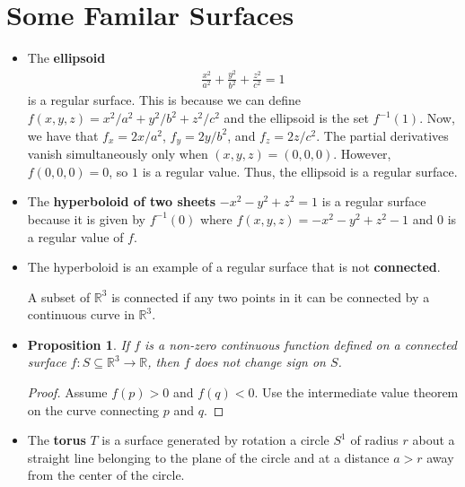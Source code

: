\documentclass[10pt]{article}
\newtheorem{proposition}[lemma]{Proposition}
\newcommand{\ra}{\rightarrow}
\newcommand{\Real}{\mathbb{R}}
\newcommand{\sseq}{\subseteq}
\begin{document}
  \section{Some Familar Surfaces}
  \begin{itemize}
    \item The {\bf ellipsoid}
    \begin{align*}
      \frac{x^2}{a^2}  + \frac{y^2}{b^2} + \frac{z^2}{c^2}  = 1
    \end{align*}
    is a regular surface. This is because we can define $f(x,y,z) = x^2/a^2 + y^2/b^2 + z^2/c^2$ and the ellipsoid is the set $f^{-1}(1)$.
    Now, we have that $f_x = 2x/a^2$, $f_y = 2y/b^2$, and $f_z = 2z/c^2$. The partial derivatives vanish simultaneously only when $(x,y,z) = (0,0,0)$. However, $f(0,0,0) = 0$, so $1$ is a regular value. Thus, the ellipsoid is a regular surface.

    \item The {\bf hyperboloid of two sheets} $-x^2 -y^2 + z^2 = 1$ is a regular surface because it is given by $f^{-1}(0)$ where $f(x,y,z) = -x^2 - y^2 + z^2 -1$ and $0$ is a regular value of $f$.

    \item The hyperboloid is an example of a regular surface that is not {\bf connected}. 

    A subset of $\Real^3$ is connected if any two points in it can be connected by a continuous curve in $\Real^3$.

    \item \begin{proposition}
      If $f$ is a non-zero continuous function defined on a connected surface $f:S \sseq \Real^3 \ra \Real$, then $f$ does not change sign on $S$.      
    \end{proposition}
    \begin{proof}
      Assume $f(p) > 0$ and $f(q) < 0$. Use the intermediate value theorem on the curve connecting $p$ and $q$.
    \end{proof}

    \item The {\bf torus} $T$ is a surface generated by rotation a circle $S^1$ of radius $r$ about a straight line belonging to the plane of the circle and at a distance $a > r$ away from the center of the circle.


\end{itemize}
\end{document}
